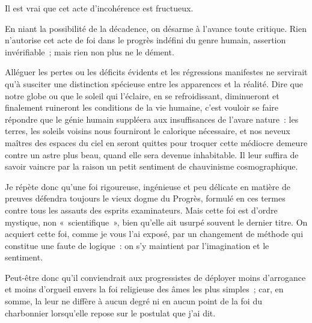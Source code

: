 \documentclass[french,twoside]{book} %
\newcommand{\astermono}{\medskip\centerline{\color{rubric}\large\selectfont{\syms ✻}}\medskip\par}%
\begin{document}
\astermono

\noindent Il est vrai que cet acte d’incohérence est fructueux.\par
En niant la possibilité de la décadence, on désarme à l’avance toute critique. Rien n’autorise cet acte de foi dans le progrès indéfini du genre humain, assertion invérifiable ; mais rien non plus ne le dément.\par
Alléguer les pertes ou les déficits évidents et les régressions manifestes ne servirait qu’à susciter une distinction spécieuse entre les apparences et la réalité. Dire que notre globe ou que le soleil qui l’éclaire, en se refroidissant, diminueront et finalement ruineront les conditions de la vie humaine, c’est vouloir se faire répondre que le génie humain suppléera aux insuffisances de l’avare nature : les terres, les soleils voisins nous fourniront le calorique nécessaire, et nos neveux maîtres des espaces du ciel en seront quittes pour troquer cette médiocre demeure contre un astre plus beau, quand elle sera devenue inhabitable. Il leur suffira de savoir vaincre par la raison un petit sentiment de chauvinisme cosmographique.\par

\astermono

\noindent Je répète donc qu’une foi rigoureuse, ingénieuse et peu délicate en matière de preuves défendra toujours le vieux dogme du Progrès, formulé en ces termes contre tous les assauts des esprits examinateurs. Mais cette foi est d’ordre mystique, non « scientifique », bien qu’elle ait usurpé souvent le dernier titre. On acquiert cette foi, comme je vous l’ai exposé, par un changement de méthode qui constitue une faute de logique : on s’y maintient par l’imagination et le sentiment.\par
Peut-être donc qu’il conviendrait aux progressistes de déployer moins d’arrogance et moins d’orgueil envers la foi religieuse des âmes les plus simples ; car, en somme, la leur ne diffère à aucun degré ni en aucun point de la foi du charbonnier lorsqu’elle repose sur le postulat que j’ai dit.\par

\astermono
\end{document}
